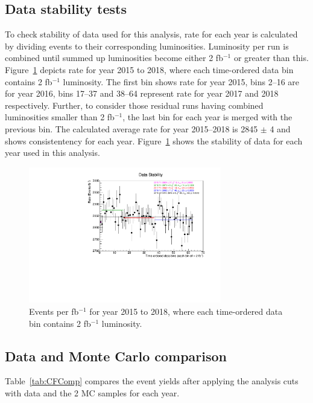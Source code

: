 \subsection{Data stability tests}
To check stability of data used for this analysis, rate for each year is calculated by dividing events to their corresponding luminosities. Luminosity per run is combined until summed up luminosities become either 2 fb$^{-1}$ or greater than this. Figure~\ref{fig:DataStability} depicts rate for year 2015 to 2018, where each time-ordered data bin contains 2 fb$^{-1}$ luminosity. The first bin shows rate for year 2015, bins 2--16 are for year 2016, bins 17--37 and 38--64 represent rate for year 2017 and 2018 respectively. Further, to consider those residual runs having combined luminosities smaller than 2 fb$^{-1}$, the last bin for each year is merged with the previous bin. The calculated average rate for year 2015--2018 is 2845 $\pm$ 4 and shows consistentency for each year. Figure~\ref{fig:DataStability} shows the stability of data for each year used in this analysis.
\begin{figure}[h!]
\centering
\includegraphics[width=0.75\textwidth]{figures/DataStability.pdf}
\caption{Events per fb$^{-1}$ for year 2015 to 2018, where each time-ordered data bin contains 2 fb$^{-1}$ luminosity.}
\label{fig:DataStability}
\end{figure}

\subsection{Data and Monte Carlo comparison}

Table~\ref{tab:CFComp} compares the event yields after applying the analysis cuts with data and the 2 MC samples for each year.


